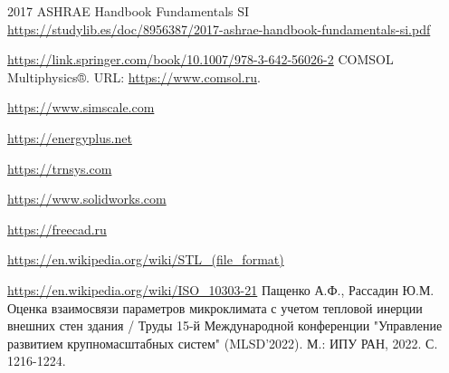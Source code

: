 \documentclass[a4paper,article,14pt]{extarticle}
\begin{document}


\tableofcontents
\pagebreak










\newpage
\begin{thebibliography}{1}
 2017 ASHRAE Handbook Fundamentals SI \\
\url{https://studylib.es/doc/8956387/2017-ashrae-handbook-fundamentals-si.pdf}

 \url{https://link.springer.com/book/10.1007/978-3-642-56026-2}
 COMSOL Multiphysics®﻿. URL: \url{https://www.comsol.ru}.

 \url{https://www.simscale.com}

 \url{https://energyplus.net}

 \url{https://trnsys.com}

 \url{https://www.solidworks.com}

 \url{https://freecad.ru}

 \url{https://en.wikipedia.org/wiki/STL_(file_format)}

 \url{https://en.wikipedia.org/wiki/ISO_10303-21}
 Пащенко А.Ф., Рассадин Ю.М. Оценка взаимосвязи параметров микроклимата с учетом тепловой инерции внешних стен здания / Труды 15-й Международной конференции "Управление развитием крупномасштабных систем" (MLSD’2022). М.: ИПУ РАН, 2022. С. 1216-1224.


\end{thebibliography}
\end{document}
